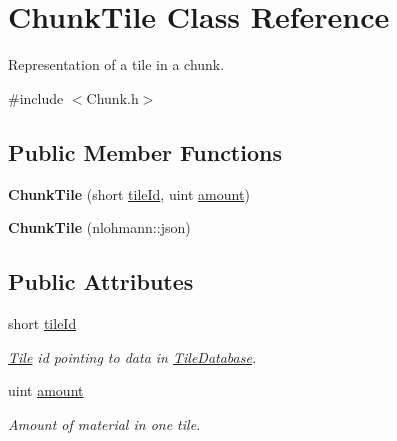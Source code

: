\hypertarget{classChunkTile}{\section{Chunk\-Tile Class Reference}
\label{classChunkTile}
}


Representation of a tile in a chunk.  




{\ttfamily \#include $<$Chunk.\-h$>$}

\subsection*{Public Member Functions}
\begin{DoxyCompactItemize}
\item 
\hypertarget{classChunkTile_a9384499af7d00c6822b7f59d356bd6a3}{{\bfseries Chunk\-Tile} (short \hyperlink{classChunkTile_ac7277fa1d196411449a646d3eed73b39}{tile\-Id}, uint \hyperlink{classChunkTile_a29ac3a16c7075941a5c483f1a3372364}{amount})}\label{classChunkTile_a9384499af7d00c6822b7f59d356bd6a3}

\item 
\hypertarget{classChunkTile_a00633aab2a6285d570f880e4cb216831}{{\bfseries Chunk\-Tile} (nlohmann\-::json)}\label{classChunkTile_a00633aab2a6285d570f880e4cb216831}

\end{DoxyCompactItemize}
\subsection*{Public Attributes}
\begin{DoxyCompactItemize}
\item 
\hypertarget{classChunkTile_ac7277fa1d196411449a646d3eed73b39}{short \hyperlink{classChunkTile_ac7277fa1d196411449a646d3eed73b39}{tile\-Id}}\label{classChunkTile_ac7277fa1d196411449a646d3eed73b39}

\begin{DoxyCompactList}\small\item\em \hyperlink{classTile}{Tile} id pointing to data in \hyperlink{classTileDatabase}{Tile\-Database}. \end{DoxyCompactList}\item 
\hypertarget{classChunkTile_a29ac3a16c7075941a5c483f1a3372364}{uint \hyperlink{classChunkTile_a29ac3a16c7075941a5c483f1a3372364}{amount}}\label{classChunkTile_a29ac3a16c7075941a5c483f1a3372364}

\begin{DoxyCompactList}\small\item\em Amount of material in one tile. \end{DoxyCompactList}\end{DoxyCompactItemize}

